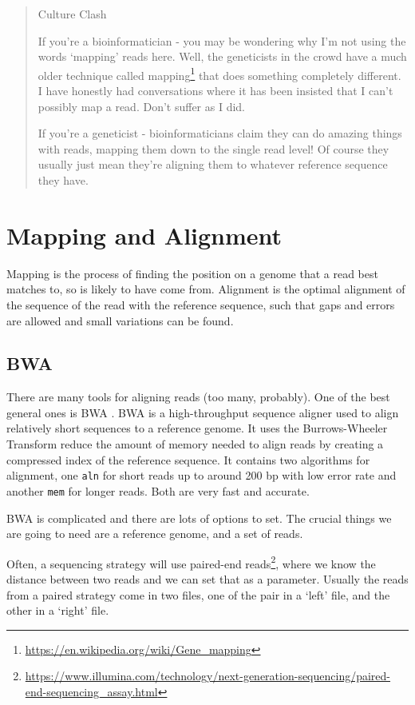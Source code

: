 \documentclass[12pt,]{book}
\let\rmarkdownfootnote\footnote%
\def\footnote{\protect\rmarkdownfootnote}
\renewcommand{\href}[2]{#2\footnote{\url{#1}}}
\theoremstyle{definition}
\theoremstyle{definition}
\theoremstyle{remark}
\begin{document}
\begin{quote}
Culture Clash

If you're a bioinformatician - you may be wondering why I'm not using
the words `mapping' reads here. Well, the geneticists in the crowd have
a much older technique called
\href{https://en.wikipedia.org/wiki/Gene_mapping}{mapping} that does
something completely different. I have honestly had conversations where
it has been insisted that I can't possibly map a read. Don't suffer as I
did.

If you're a geneticist - bioinformaticians claim they can do amazing
things with reads, mapping them down to the single read level! Of course
they usually just mean they're aligning them to whatever reference
sequence they have.
\end{quote}

\section{Mapping and Alignment}\label{mapping-and-alignment}

Mapping is the process of finding the position on a genome that a read
best matches to, so is likely to have come from. Alignment is the
optimal alignment of the sequence of the read with the reference
sequence, such that gaps and errors are allowed and small variations can
be found.

\subsection{BWA}\label{bwa}

There are many tools for aligning reads (too many, probably). One of the
best general ones is BWA \citep{Li:2010bl}. BWA is a high-throughput
sequence aligner used to align relatively short sequences to a reference
genome. It uses the Burrows-Wheeler Transform reduce the amount of
memory needed to align reads by creating a compressed index of the
reference sequence. It contains two algorithms for alignment, one
\texttt{aln} for short reads up to around 200 bp with low error rate and
another \texttt{mem} for longer reads. Both are very fast and accurate.

BWA is complicated and there are lots of options to set. The crucial
things we are going to need are a reference genome, and a set of reads.

Often, a sequencing strategy will use
\href{https://www.illumina.com/technology/next-generation-sequencing/paired-end-sequencing_assay.html}{paired-end
reads}, where we know the distance between two reads and we can set that
as a parameter. Usually the reads from a paired strategy come in two
files, one of the pair in a `left' file, and the other in a `right'
file.
\end{document}
